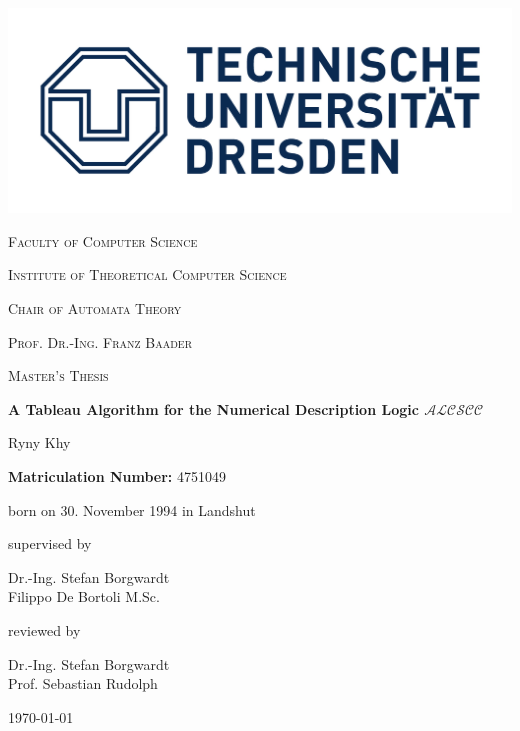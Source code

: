 \documentclass{book}
\theoremstyle{break}
\theoremstyle{definition}
\begin{document}
\begin{titlepage}
	\centering
	
	\includegraphics[scale=0.15]{logo}\\
	{\scshape\Large Faculty of Computer Science \par}
	\vspace{0.5cm}
	{\scshape\Large Institute of Theoretical Computer Science \par}
	\vspace{0.5cm}
	{\scshape\Large Chair of Automata Theory \par}
	\vspace{0.5cm}
	{\scshape\Large Prof. Dr.-Ing. Franz Baader \par}
	\vspace{1.5cm}
	{\scshape\large Master's Thesis\par}
	\vspace{1.5cm}
	{\LARGE\bfseries A Tableau Algorithm for the Numerical Description Logic $\mathcal{ALCSCC}$\par}
	\vspace{1.6cm}
	{\Large Ryny Khy\par}
	\vspace{0.5cm}
	\textbf{Matriculation Number:} 4751049\par
	born on 30. November 1994 in Landshut
	\vspace{0.5cm}
	\vfill
	\begin{minipage}[t]{.65\textwidth}
\raggedright
supervised by\par
	Dr.-Ing. Stefan Borgwardt\\
	Filippo De Bortoli M.Sc.
	\vfill
\end{minipage}%
\begin{minipage}[t]{.35\textwidth}
\raggedright
	reviewed by\par
	Dr.-Ing. Stefan Borgwardt\\
	Prof. Sebastian Rudolph\\

\end{minipage}

	\vfill

	{\large \today\par}
\end{titlepage}
\end{document}
